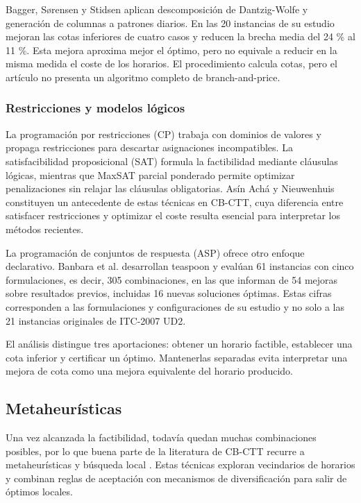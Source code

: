 \documentclass[journal]{IEEEtran}
\begin{document}
Bagger, Sørensen y Stidsen \cite{ref7} aplican descomposición de Dantzig-Wolfe y generación de columnas a patrones diarios. En las 20 instancias de su estudio mejoran las cotas inferiores de cuatro casos y reducen la brecha media del 24 \% al 11 \%. Esta mejora aproxima mejor el óptimo, pero no equivale a reducir en la misma medida el coste de los horarios. El procedimiento calcula cotas, pero el artículo no presenta un algoritmo completo de branch-and-price.


\subsubsection{Restricciones y modelos lógicos}

La programación por restricciones (CP) trabaja con dominios de valores y propaga restricciones para descartar asignaciones incompatibles. La satisfacibilidad proposicional (SAT) formula la factibilidad mediante cláusulas lógicas, mientras que MaxSAT parcial ponderado permite optimizar penalizaciones sin relajar las cláusulas obligatorias. Asín Achá y Nieuwenhuis \cite{ref8} constituyen un antecedente de estas técnicas en CB-CTT, cuya diferencia entre satisfacer restricciones y optimizar el coste resulta esencial para interpretar los métodos recientes.


La programación de conjuntos de respuesta (ASP) ofrece otro enfoque declarativo. Banbara et al. \cite{ref9} desarrollan teaspoon y evalúan 61 instancias con cinco formulaciones, es decir, 305 combinaciones, en las que informan de 54 mejoras sobre resultados previos, incluidas 16 nuevas soluciones óptimas. Estas cifras corresponden a las formulaciones y configuraciones de su estudio y no solo a las 21 instancias originales de ITC-2007 UD2.


El análisis distingue tres aportaciones: obtener un horario factible, establecer una cota inferior y certificar un óptimo. Mantenerlas separadas evita interpretar una mejora de cota como una mejora equivalente del horario producido.


\subsection{Metaheurísticas}

Una vez alcanzada la factibilidad, todavía quedan muchas combinaciones posibles, por lo que buena parte de la literatura de CB-CTT recurre a metaheurísticas y búsqueda local \cite{ref2}. Estas técnicas exploran vecindarios de horarios y combinan reglas de aceptación con mecanismos de diversificación para salir de óptimos locales.
\end{document}
